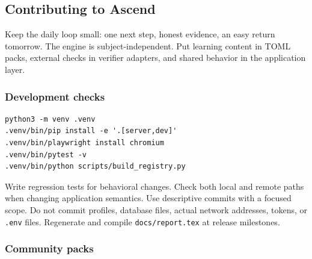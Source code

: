 \hypertarget{contributing-to-ascend}{%
\subsection{Contributing to Ascend}\label{contributing-to-ascend}}

Keep the daily loop small: one next step, honest evidence, an easy
return tomorrow. The engine is subject-independent. Put learning content
in TOML packs, external checks in verifier adapters, and shared behavior
in the application layer.

\hypertarget{development-checks}{%
\subsubsection{Development checks}\label{development-checks}}

\begin{verbatim}
python3 -m venv .venv
.venv/bin/pip install -e '.[server,dev]'
.venv/bin/playwright install chromium
.venv/bin/pytest -v
.venv/bin/python scripts/build_registry.py
\end{verbatim}

Write regression tests for behavioral changes. Check both local and
remote paths when changing application semantics. Use descriptive
commits with a focused scope. Do not commit profiles, database files,
actual network addresses, tokens, or \texttt{.env} files. Regenerate and
compile \texttt{docs/report.tex} at release milestones.

\hypertarget{community-packs}{%
\subsubsection{Community packs}\label{community-packs}}

